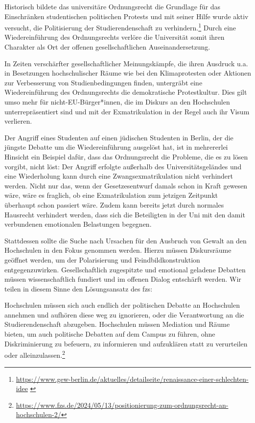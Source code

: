 \documentclass[DIV=calc]{scrartcl}
\let\oldgrqq=\grqq
\def\grqq{\oldgrqq\xspace}
\begin{document}
Historisch bildete das universitäre Ordnungsrecht die Grundlage für das Einschränken studentischen politischen Protests und mit seiner Hilfe wurde aktiv versucht, die Politisierung der Studierendenschaft zu verhindern.\footnote{\url{https://www.gew-berlin.de/aktuelles/detailseite/renaissance-einer-schlechten-idee} \label{note2}} Durch eine Wiedereinführung des Ordnungsrechts verlöre die Universität somit ihren Charakter als Ort der offenen gesellschaftlichen Auseinandersetzung.

In Zeiten verschärfter gesellschaftlicher Meinungskämpfe, die ihren Ausdruck u.a. in Besetzungen hochschulischer Räume wie bei den Klimaprotesten oder Aktionen zur Verbesserung von Studienbedingungen finden, untergräbt eine Wiedereinführung des Ordnungsrechts die demokratische Protestkultur. Dies gilt umso mehr für nicht-EU-Bürger*innen, die im Diskurs an den Hochschulen unterrepräsentiert sind und mit der Exmatrikulation in der Regel auch ihr Visum verlieren.

Der Angriff eines Studenten auf einen jüdischen Studenten in Berlin, der die jüngste Debatte um die Wiedereinführung ausgelöst hat, ist in mehrererlei Hinsicht ein Beispiel dafür, dass das Ordnungsrecht die Probleme, die es zu lösen vorgibt, nicht löst: Der Angriff erfolgte außerhalb des Universitätsgeländes und eine Wiederholung kann durch eine Zwangsexmatrikulation nicht verhindert werden. Nicht nur das, wenn der Gesetzesentwurf damals schon in Kraft gewesen wäre, wäre es fraglich, ob eine Exmatrikulation zum jetzigen Zeitpunkt überhaupt schon passiert wäre. Zudem kann bereits jetzt durch normales Hausrecht verhindert werden, dass sich die Beteiligten in der Uni mit den damit verbundenen emotionalen Belastungen begegnen.

Stattdessen sollte die Suche nach Ursachen für den Ausbruch von Gewalt an den Hochschulen in den Fokus genommen werden. Hierzu müssen Diskursräume geöffnet werden, um der Polarisierung und Feindbildkonstruktion entgegenzuwirken. Gesellschaftlich zugespitzte und emotional geladene Debatten müssen wissenschaftlich fundiert und im offenen Dialog entschärft werden. Wir teilen in diesem Sinne den Lösungsansatz des fzs:

\glqq Hochschulen müssen sich auch endlich der politischen Debatte an Hochschulen annehmen und aufhören diese weg zu ignorieren, oder die Verantwortung an die Studierendenschaft abzugeben. Hochschulen müssen Mediation und Räume bieten, um auch politische Debatten auf dem Campus zu führen, ohne Diskriminierung zu befeuern, zu informieren und aufzuklären statt zu verurteilen oder alleinzulassen.\grqq\footnote{\url{https://www.fzs.de/2024/05/13/positionierung-zum-ordnungsrecht-an-hochschulen-2/}}
\end{document}
